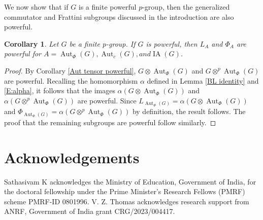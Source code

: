\documentclass[12pt]{elsarticle}
\newtheorem{corollary}[theorem]{Corollary}
\newtheorem*{main corollary*}{Main Corollary}
\theoremstyle{definition}
\newcommand{\ptens}{
	\otimes^p}
\begin{document}
We now show that if $G$ is a finite powerful $p$-group, then the generalized commutator and Frattini subgroups discussed in the introduction are also powerful.
\begin{corollary} \label{Corollary: Generalizations of Commutator and Frattini are powerful}
    Let $G$ be a finite $p$-group. If $G$ is powerful, then $L_A$ and $
    \Phi_A$ are powerful for $A=\operatorname{Aut}_\Phi(G), \operatorname{Aut}_c(G), and \operatorname{IA}(G)$.
\end{corollary}

\begin{proof}
    By Corollary \ref{Aut tensor powerful}, $G \otimes \operatorname{Aut}_\Phi(G)$ and $G \ptens \operatorname{Aut}_\Phi(G)$ are powerful. Recalling the homomorphism $\alpha$ defined in Lemma \ref{BL identity} and \eqref{E:alpha}, it follows that the images $\alpha( G \otimes \operatorname{Aut}_\Phi(G))$ and $\alpha( G \ptens \operatorname{Aut}_\Phi(G))$ are powerful. Since $L_{\operatorname{Aut}_\Phi(G)} = \alpha( G \otimes \operatorname{Aut}_\Phi(G))$ and $\Phi_{\operatorname{Aut}_\Phi(G)} = \alpha( G \ptens \operatorname{Aut}_\Phi(G))$ by definition, the result follows. The proof that the remaining subgroups are powerful follow similarly.
\end{proof}


\section*{Acknowledgements} 
Sathasivam K acknowledges the Ministry of Education,  Government of India, for the doctoral fellowship under the Prime Minister's Research Fellows (PMRF) scheme PMRF-ID 0801996. V. Z. Thomas acknowledges research support from ANRF, Government of India grant CRG/2023/004417.




\end{document}
